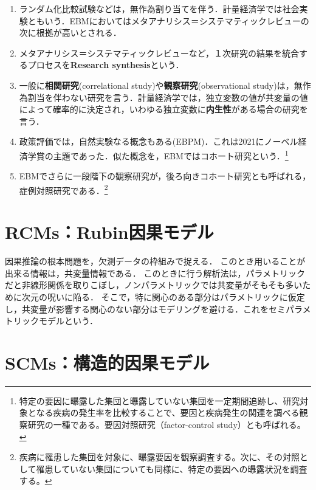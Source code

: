 \documentclass[uplatex,dvipdfmx]{jsreport}
\begin{document}
\begin{example}\mbox{}
    \begin{enumerate}
        \item ランダム化比較試験などは，無作為割り当てを伴う．計量経済学では社会実験ともいう．EBMにおいてはメタアナリシス＝システマティックレビューの次に根拠が高いとされる．
        \item メタアナリシス＝システマティックレビューなど，１次研究の結果を統合するプロセスを\textbf{Research synthesis}という．
        \item 一般に\textbf{相関研究}(correlational study)や\textbf{観察研究}(observational study)は，無作為割当を伴わない研究を言う．計量経済学では，独立変数の値が共変量の値によって確率的に決定され，いわゆる独立変数に\textbf{内生性}がある場合の研究を言う．
        \item 政策評価では，自然実験なる概念もある(EBPM)．これは2021にノーベル経済学賞の主題であった．似た概念を，EBMではコホート研究という．\footnote{特定の要因に曝露した集団と曝露していない集団を一定期間追跡し、研究対象となる疾病の発生率を比較することで、要因と疾病発生の関連を調べる観察研究の一種である。要因対照研究（factor-control study）とも呼ばれる。}
        \item EBMでさらに一段階下の観察研究が，後ろ向きコホート研究とも呼ばれる，症例対照研究である．\footnote{疾病に罹患した集団を対象に、曝露要因を観察調査する。次に、その対照として罹患していない集団についても同様に、特定の要因への曝露状況を調査する。}
    \end{enumerate}
\end{example}

\section{RCMs：Rubin因果モデル}

\begin{tcolorbox}[colframe=ForestGreen, colback=ForestGreen!10!white,breakable,colbacktitle=ForestGreen!40!white,coltitle=black,fonttitle=\bfseries\sffamily,
title=]
    因果推論の根本問題を，欠測データの枠組みで捉える．
    このとき用いることが出来る情報は，共変量情報である．
    このときに行う解析法は，パラメトリックだと非線形関係を取りこぼし，ノンパラメトリックでは共変量がそもそも多いために次元の呪いに陥る．
    そこで，特に関心のある部分はパラメトリックに仮定し，共変量が影響する関心のない部分はモデリングを避ける．これをセミパラメトリックモデルという．
\end{tcolorbox}

\section{SCMs：構造的因果モデル}
\end{document}
